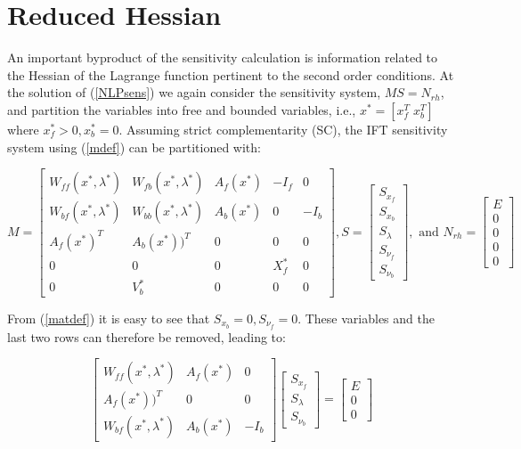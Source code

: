\documentclass[letter, 11pt]{article}
\newcommand{\vect}[1]{{\left[\begin{array}{c} #1 \end{array}\right]}}
\newcommand{\matr}[2]{{\left[\begin{array}{#1} #2 \end{array}\right]}}
\begin{document}

\section{Reduced Hessian}

An important byproduct of the sensitivity calculation is information
related to the Hessian of the Lagrange function pertinent to the
second order conditions. At the solution of (\ref{NLPsens}) we again
consider the sensitivity system, $M S = N_{rh}$, and partition the
variables into free and bounded variables, i.e., $x^* = [x_f^T \; x_b^T]$ where $x^*_f > 0,
x^*_b = 0$. Assuming strict complementarity (SC), the IFT sensitivity
system using (\ref{mdef}) can be partitioned with:

\begin{equation}
M =  \matr{ccccc}{W_{ff}(x^*,\lambda^*) & W_{fb}(x^*,\lambda^*) & A_f(x^*) & -I_f & 0 \\
W_{bf}(x^*,\lambda^*) & W_{bb}(x^*,\lambda^*) & A_b(x^*) & 0  & -I_b \\
A_f(x^*)^T &  A_b(x^*))^T &0 &0 & 0\\
0 &  0 & 0 &X_f^* & 0 \\
0 & V_b^*& 0 & 0  & 0},
S = \vect{S_{x_f} \\ S_{x_b} \\ S_{\lambda} \\ S_{\nu_f} \\ S_{\nu_b}},
\mbox{ and }
N_{rh} = \vect{E \\ 0 \\ 0 \\ 0 \\ 0}  \label{matdef}
\end{equation}

From (\ref{matdef}) it is easy to see that $S_{x_b} = 0, S_{\nu_f}
= 0$. These variables and the last two rows can therefore be removed,
leading to:

\begin{equation*}
\matr{ccc}{W_{ff}(x^*,\lambda^*) & A_f(x^*) &  0 \\
A_f(x^*))^T  &0 & 0\\
W_{bf}(x^*,\lambda^*) & A_b(x^*)  & -I_b}
\vect{S_{x_f}  \\ S_{\lambda} \\ S_{\nu_b}}
= \vect{E \\ 0 \\ 0}
\end{equation*}
\end{document}
